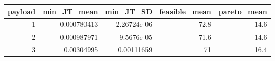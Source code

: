 \begin{tabular}{rrrrr}
\toprule
payload & min\_JT\_mean & min\_JT\_SD & feasible\_mean & pareto\_mean \\
\midrule
1 & 0.000780413 & 2.26724e-06 & 72.8 & 14.6 \\
2 & 0.000987971 & 9.5676e-05 & 71.6 & 14.6 \\
3 & 0.00304995 & 0.00111659 & 71 & 16.4 \\
\bottomrule
\end{tabular}
